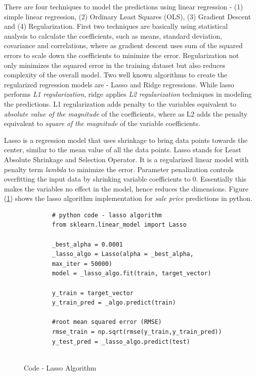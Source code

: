 \documentclass[sigconf]{acmart}
\begin{document}
    There are four techniques to model the predictions using linear regression - (1) simple linear regression, (2) Ordinary Least Squares (OLS), (3) Gradient Descent and (4) Regularization. First two techniques are basically using statistical analysis to calculate the coefficients, such as means, standard deviation, covariance and correlations, where as gradient descent uses sum of the squared errors to scale down the coefficients to minimize the error. Regularization not only minimizes the squared error in the training dataset but also reduces complexity of the overall model. Two well known algorithms to create the regularized regression models are - Lasso and Ridge regressions.  While lasso performs {\em L1 regularization}, ridge applies {\em L2 regularization} techniques in modeling the predictions. L1 regularization adds penalty to the variables equivalent to {\em absolute value of the magnitude} of the coefficients, where as L2 adds the penalty equivalent to {\em square of the magnitude} of the variable coefficients.  
    
    Lasso is a regression model that uses shrinkage to bring data points towards the center, similar to the mean value of all the data points. Lasso stands for Least Absolute Shrinkage and Selection Operator. It is a regularized linear model with penalty term {\em lambda} to minimize the error. Parameter penalization controls overfitting the input data by shrinking variable coefficients to 0. Essentially this makes the variables no effect in the model, hence reduces the dimensions. Figure (\ref{c:lasso}) shows the lasso algorithm implementation for {\em sale price} predictions in python.
	
	\begin{figure}[htb]
		\begin{verbatim}	
		# python code - lasso algorithm
		from sklearn.linear_model import Lasso
		
		_best_alpha = 0.0001		
		_lasso_algo = Lasso(alpha = _best_alpha, 
		max_iter = 50000)	
		model = _lasso_algo.fit(train, target_vector)  
		
		y_train = target_vector
		y_train_pred = _algo.predict(train)
		
		#root mean squared error (RMSE)
		rmse_train = np.sqrt(rmse(y_train,y_train_pred))		
		y_test_pred = _lasso_algo.predict(test)	
			
		\end{verbatim}
		\caption{Code - Lasso Algorithm} \label{c:lasso} 
	\end{figure}
	
\end{document}
